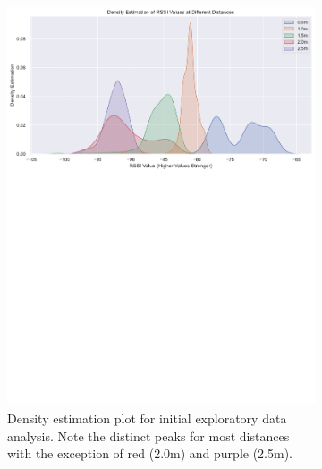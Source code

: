 \documentclass{l4proj}
\begin{document}
\begin{figure}[!htb]
    \centering
    \begin{subfigure}[b]{0.40\textwidth}
        \includegraphics[width=\textwidth]{images/initial_rssi_density.pdf}
        \caption{Density estimation plot for initial exploratory data analysis. Note the distinct peaks for most distances with the exception of red (2.0m) and purple (2.5m).}
        \label{fig:initial_density}
    \end{subfigure}
    ~
    \begin{subfigure}[b]{0.40\textwidth}

\end{subfigure}
\end{figure}
\end{document}
